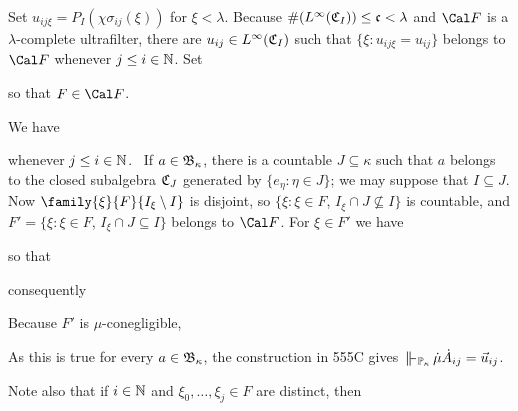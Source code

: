 {\medskip

 Set $u_{ij\xi}=P_I(\chi\sigma_{ij}(\xi))$ for
$\xi<\lambda$.   Because $\#(L^{\infty}(\frak C_I))\le\frak c<\lambda$ and
$\Cal F$ is a $\lambda$-complete ultrafilter, there are
$u_{ij}\in L^{\infty}(\frak C_I)$ such that
$\{\xi:u_{ij\xi}=u_{ij}\}$ belongs to
$\Cal F$ whenever $j\le i\in\Bbb N$.   Set


\noindent so that $F\in\Cal F$.

\medskip

 We have


\noindent whenever $j\le i\in\Bbb N$.   \Prf\ If $a\in\frak B_{\kappa}$,
there is a countable $J\subseteq\kappa$ such that $a$ belongs to the
closed subalgebra $\frak C_J$ generated by $\{e_{\eta}:\eta\in J\}$;  we
may suppose that $I\subseteq J$.   Now
$\family{\xi}{F}{I_{\xi}\setminus I}$ is disjoint, so
$\{\xi:\xi\in F$, $I_{\xi}\cap J\not\subseteq I\}$ is countable, and
$F'=\{\xi:\xi\in F$, $I_{\xi}\cap J\subseteq I\}$ belongs to $\Cal F$.
For $\xi\in F'$ we have


\noindent so that


\noindent consequently


\noindent Because $F'$ is $\mu$-conegligible,


\noindent As this is true for every $a\in\frak B_{\kappa}$, the
construction in 555C gives $\VVdPk\,\dot\mu\dot A_{ij}=\vec u_{ij}$.\ \Qed

\medskip

 Note also that if $i\in\Bbb N$ and
$\xi_0,\ldots,\xi_j\in F$ are distinct, then


}
